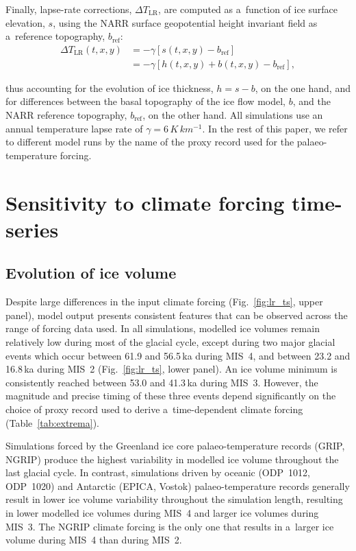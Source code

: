 \documentclass[tc, manuscript]{copernicus}
\begin{document}
      Finally, lapse-rate corrections, ${\Delta}T_{\text{LR}}$, are computed as
      a~function of ice surface elevation, $s$, using the NARR surface
      geopotential height invariant field as a~reference topography,
      $b_{\text{ref}}$:
\begin{align}
{\Delta}T_{\text{LR}}(t, x, y) &= -\gamma [s(t, x, y)-b_{\text{ref}}] \\
                            &= -\gamma [h(t, x, y)+b(t, x, y)-b_{\text{ref}}],
\end{align}

      thus accounting for the evolution of ice thickness, ${h=s-b}$, on the
      one hand, and for differences between the basal topography of the ice
      flow model, $b$, and the NARR reference topography, $b_{\text{ref}}$, on the
      other hand. All simulations use an annual temperature lapse rate of
      $\gamma = 6\,\unit{K\,km^{-1}}$. In the rest of this paper, we refer
      to different model runs by the name of the proxy record used for the
      palaeo-temperature forcing.

\section{Sensitivity to climate forcing time-series}
\label{sec:results}

\subsection{Evolution of ice volume}

      Despite large differences in the input climate forcing
      (Fig.~\ref{fig:lr_ts}, upper panel), model output presents consistent
      features that can be observed across the range of forcing data used.
      In all simulations, modelled ice volumes remain relatively low during
      most of the glacial cycle, except during two major glacial events
      which occur between 61.9 and 56.5\,\unit{ka} during MIS~4, and between
      23.2 and 16.8\,\unit{ka} during MIS~2 (Fig.~\ref{fig:lr_ts}, lower
      panel). An ice volume minimum is consistently reached between 53.0 and
      41.3\,\unit{ka} during MIS~3. However, the magnitude and precise
      timing of these three events depend significantly on the choice of
      proxy record used to derive a~time-dependent climate forcing
      (Table~\ref{tab:extrema}).

      Simulations forced by the Greenland ice core palaeo-temperature
      records (GRIP, NGRIP) produce the highest variability in modelled ice
      volume throughout the last glacial cycle. In contrast, simulations
      driven by oceanic (ODP~1012, ODP~1020) and Antarctic (EPICA, Vostok)
      palaeo-temperature records generally result in lower ice volume
      variability throughout the simulation length, resulting in lower
      modelled ice volumes during MIS~4 and larger ice volumes during MIS~3.
      The NGRIP climate forcing is the only one that results in a~larger ice
      volume during MIS~4 than during MIS~2.
\end{document}
